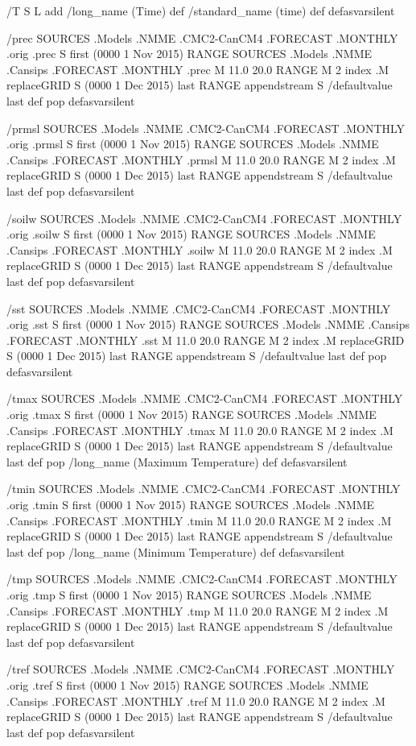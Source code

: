 \begin{ingrid}
/T { S L add
/long_name (Time) def
/standard_name (time) def } defasvarsilent

/prec {
 SOURCES .Models .NMME .CMC2-CanCM4 .FORECAST .MONTHLY .orig .prec
S first (0000 1 Nov 2015) RANGE
 SOURCES .Models .NMME .Cansips .FORECAST .MONTHLY .prec
 M 11.0 20.0 RANGE
 M 2 index .M replaceGRID
S (0000 1 Dec 2015) last RANGE
appendstream
S /defaultvalue last def pop
} defasvarsilent

/prmsl {
 SOURCES .Models .NMME .CMC2-CanCM4 .FORECAST .MONTHLY .orig .prmsl 
S first (0000 1 Nov 2015) RANGE
 SOURCES .Models .NMME .Cansips .FORECAST .MONTHLY .prmsl
 M 11.0 20.0 RANGE
 M 2 index .M replaceGRID
S (0000 1 Dec 2015) last RANGE
appendstream
S /defaultvalue last def pop
} defasvarsilent

/soilw {
SOURCES .Models .NMME .CMC2-CanCM4 .FORECAST .MONTHLY .orig .soilw
S first (0000 1 Nov 2015) RANGE
SOURCES .Models .NMME .Cansips .FORECAST .MONTHLY .soilw
 M 11.0 20.0 RANGE
 M 2 index .M replaceGRID
S (0000 1 Dec 2015) last RANGE
appendstream
S /defaultvalue last def pop
} defasvarsilent

/sst {
 SOURCES .Models .NMME .CMC2-CanCM4 .FORECAST .MONTHLY .orig .sst 
S first (0000 1 Nov 2015) RANGE
 SOURCES .Models .NMME .Cansips .FORECAST .MONTHLY .sst
 M 11.0 20.0 RANGE
 M 2 index .M replaceGRID
S (0000 1 Dec 2015) last RANGE
appendstream
S /defaultvalue last def pop
} defasvarsilent

/tmax {
 SOURCES .Models .NMME .CMC2-CanCM4 .FORECAST .MONTHLY .orig .tmax 
S first (0000 1 Nov 2015) RANGE
 SOURCES .Models .NMME .Cansips .FORECAST .MONTHLY .tmax
 M 11.0 20.0 RANGE
 M 2 index .M replaceGRID
S (0000 1 Dec 2015) last RANGE
appendstream
S /defaultvalue last def pop
/long_name (Maximum Temperature) def
} defasvarsilent

/tmin {
 SOURCES .Models .NMME .CMC2-CanCM4 .FORECAST .MONTHLY .orig .tmin 
S first (0000 1 Nov 2015) RANGE
 SOURCES .Models .NMME .Cansips .FORECAST .MONTHLY .tmin
 M 11.0 20.0 RANGE
 M 2 index .M replaceGRID
S (0000 1 Dec 2015) last RANGE
appendstream
S /defaultvalue last def pop
/long_name (Minimum Temperature) def
} defasvarsilent

/tmp {
 SOURCES .Models .NMME .CMC2-CanCM4 .FORECAST .MONTHLY .orig .tmp 
S first (0000 1 Nov 2015) RANGE
 SOURCES .Models .NMME .Cansips .FORECAST .MONTHLY .tmp
 M 11.0 20.0 RANGE
 M 2 index .M replaceGRID
S (0000 1 Dec 2015) last RANGE
appendstream
S /defaultvalue last def pop
} defasvarsilent

/tref {
 SOURCES .Models .NMME .CMC2-CanCM4 .FORECAST .MONTHLY .orig .tref 
S first (0000 1 Nov 2015) RANGE
 SOURCES .Models .NMME .Cansips .FORECAST .MONTHLY .tref
 M 11.0 20.0 RANGE
 M 2 index .M replaceGRID
S (0000 1 Dec 2015) last RANGE
appendstream
S /defaultvalue last def pop
} defasvarsilent


\end{ingrid}

